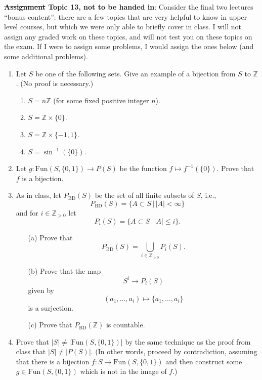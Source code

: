 \documentclass[12pt]{article}
\newcommand{\Z}{{\mathbb Z}}
\begin{document}
\noindent \textbf{\sout{Assignment} Topic 13, not to be handed in}: Consider the final two lectures ``bonus content'': there are a few topics that are very helpful to know in upper level courses, but which we were only able to briefly cover in class. I will not assign any graded work on these topics, and will not test you on these topics on the exam. If I were to assign some problems, I would assign the ones below (and some additional problems). 





\begin{enumerate}
\item Let $S$ be one of the following sets. Give an example of a bijection from $S$ to $\mathbb{Z}$. (No proof is necessary.)
  \begin{enumerate}
  \item $S = n\mathbb{Z}$ (for some fixed positive integer $n$).
  \item $S = \mathbb{Z} \times \{0\}$.    
  \item $S = \mathbb{Z} \times \{-1,1\}$.
  \item $S = \sin^{-1}(\{0\})$.
  \end{enumerate}

  
\item  Let $g\colon \text{Fun}(S, \{0,1\})  \to P(S)$ be the function $f
\mapsto f^{-1}(\{0\})$. Prove that $f$ is a bijection.\\

\item  As in class, let $P_{\text{BD}}(S)$ be the set of all finite
subsets of $S$, i.e., 
\[
P_{\text{BD}}(S) = \{ A \subset S \,|\, |A| < \infty \}
\]
and for $i \in \Z_{ >  0}$ let 
\[
P_{i}(S) = \{ A \subset S \,|\, |A| \leq i \}.
\]
\begin{itemize}
\item [(a)] Prove that
\[
P_{\text{BD}}(S) = \bigcup_{i \in \Z_{> 0}} P_i(S).
\]
\item [(b)] Prove that the map
\[
 S^i \to P_i(S) 
\]
given by 
\[
(a_1, \ldots, a_i) \mapsto \{a_1,\ldots,a_i\}
\]
is a surjection.
\item [(c)] Prove that $P_{\text{BD}}(\Z)$ is countable.\\
\end{itemize}

\item  Prove that $|S| \neq |\text{Fun}(S, \{0,1\})|$ by the same
technique as the proof from class that $|S| \neq |P(S)|$. (In other
words, proceed by contradiction, assuming that there is a bijection
$f\colon S \to \text{Fun}(S, \{0,1\})$ and then construct some $g \in
\text{Fun}(S, \{0,1\})$ which is not in the image of $f$.)
\end{enumerate}
\end{document}
